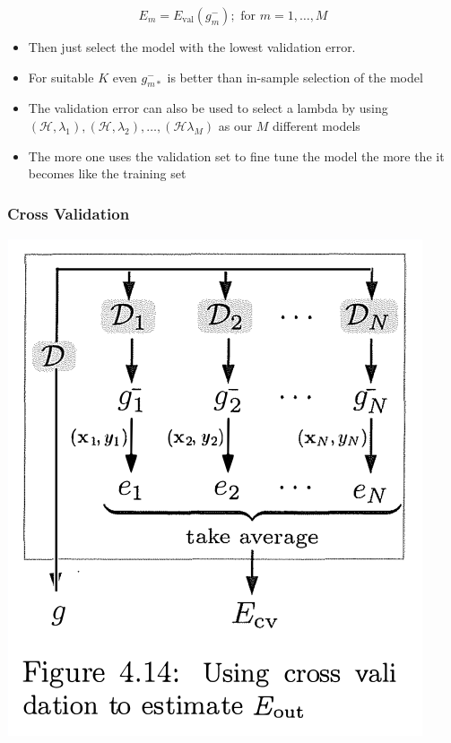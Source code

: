 \documentclass[11pt]{article}
\begin{document}
\begin{equation}
  E_m = E_\text{val}(g^-_m); \text{ for } m = 1,\dots,M
\end{equation}
\begin{itemize}
\item Then just select the model with the lowest validation error.
\item For suitable \(K\) even \(g^-_{m*}\) is better than in-sample selection of the model
\item The validation error can also be used to select a lambda by using \((\mathcal H, \lambda_1),(\mathcal H, \lambda_2),\dots,(\mathcal H \lambda_M)\) as our \(M\) different models
\item The more one uses the validation set to fine tune the model the more the it becomes like the training set
\end{itemize}

\subsubsection{Cross Validation}
\label{sec:orged2f05d}
\begin{center}
\includegraphics[width=.9\linewidth]{Overfitting (4)/screenshot_2018-09-18_20-20-44.png}
\end{center}
\end{document}
